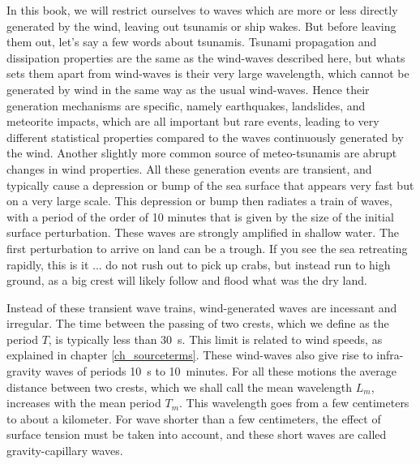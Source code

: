 In this book, we will restrict ourselves to waves which are more or less directly generated by the wind, leaving out 
tsunamis or ship wakes. But before leaving them out, let's say a few words about tsunamis. Tsunami propagation and dissipation properties 
are the same as the wind-waves described here, but whats sets them apart from wind-waves is their very large wavelength, 
which cannot be generated by wind in the same way as the usual wind-waves. Hence their generation mechanisms are specific, namely earthquakes, 
landslides, and meteorite 
impacts, which are all important but rare events, leading to very different statistical properties compared to the waves continuously 
generated by the wind. Another slightly more common source of meteo-tsunamis are abrupt changes in wind properties. 
All these generation events are transient, and typically cause a depression or bump of the sea surface that appears very fast but on a very 
large scale. This depression or bump then radiates a train of waves, with a period of the order of 10 minutes that is given by the size 
of the initial surface perturbation. These waves are strongly amplified in shallow water. The first perturbation to arrive on land can be a trough. 
If you see the sea retreating rapidly, this is it ... do not rush out to pick up crabs, but instead run to high ground, as a big crest will 
likely follow and flood what was the dry land. 

Instead of these transient wave trains, wind-generated waves are incessant and irregular.
The  time between the passing of two crests, which we define as the period $T$,  is typically less than 30~s. This limit is related 
to wind speeds, as explained in chapter \ref{ch_sourceterms}. 
These wind-waves also give rise to infra-gravity waves of periods 10~s to 10~minutes. For all these motions 
the average distance between two crests, which we shall call the mean wavelength $L_m$, increases with the mean period $T_m$. 
This wavelength goes from a few centimeters to about a kilometer. For wave shorter than a few centimeters, the effect of surface 
tension must be taken into account, and these short waves are called gravity-capillary waves. 

